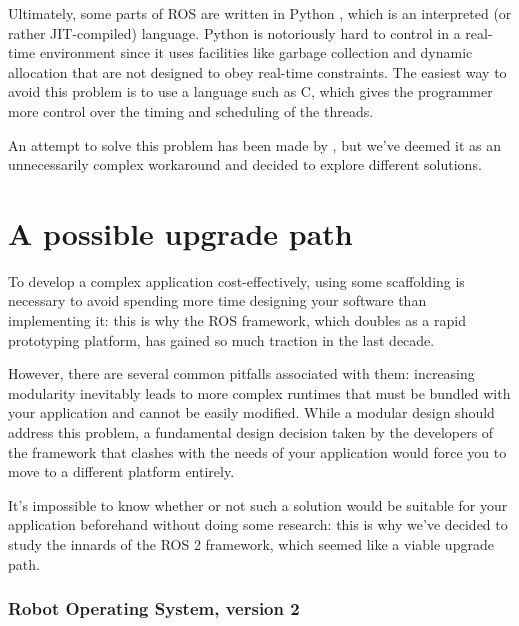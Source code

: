 \documentclass[a4paper,12pt]{report}
\begin{document}

Ultimately, some parts of ROS are written in Python \cite{roswiki-rospy}, which is an interpreted (or rather JIT-compiled) language. Python is notoriously hard to control in a real-time environment since it uses facilities like garbage collection \cite{python-devguide-gc} and dynamic allocation that are not designed to obey real-time constraints. The easiest way to avoid this problem is to use a language such as C, which gives the programmer more control over the timing and scheduling of the threads.

An attempt to solve this problem has been made by \textcite{rt-ros-approach}, but we've deemed it as an unnecessarily complex workaround and decided to explore different solutions.

\section{A possible upgrade path}

To develop a complex application cost-effectively, using some scaffolding is necessary to avoid spending more time designing your software than implementing it: this is why the ROS framework, which doubles as a rapid prototyping platform, has gained so much traction in the last decade. 

However, there are several common pitfalls associated with them: increasing modularity inevitably leads to more complex runtimes that must be bundled with your application and cannot be easily modified. While a modular design should address this problem, a fundamental design decision taken by the developers of the framework that clashes with the needs of your application would force you to move to a different platform entirely.

It's impossible to know whether or not such a solution would be suitable for your application beforehand without doing some research: this is why we've decided to study the innards of the ROS 2 framework, which seemed like a viable upgrade path.

\subsubsection{Robot Operating System, version 2}
\end{document}
